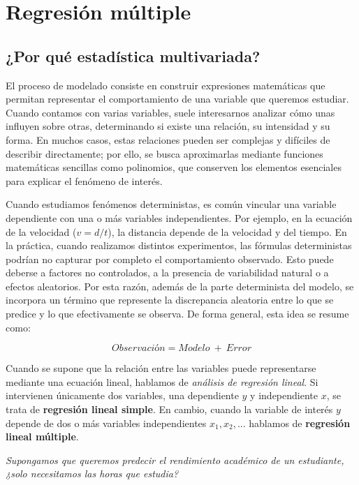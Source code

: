 \documentclass[
]{book}
\begin{document}
\chapter{Regresión múltiple}\label{regresiuxf3n-muxfaltiple}

\section{¿Por qué estadística multivariada?}\label{por-quuxe9-estaduxedstica-multivariada}

El proceso de modelado consiste en construir expresiones matemáticas que permitan representar el comportamiento de una variable que queremos estudiar. Cuando contamos con varias variables, suele interesarnos analizar cómo unas influyen sobre otras, determinando si existe una relación, su intensidad y su forma. En muchos casos, estas relaciones pueden ser complejas y difíciles de describir directamente; por ello, se busca aproximarlas mediante funciones matemáticas sencillas como polinomios, que conserven los elementos esenciales para explicar el fenómeno de interés.

Cuando estudiamos fenómenos deterministas, es común vincular una variable dependiente con una o más variables independientes. Por ejemplo, en la ecuación de la velocidad (\(v=d/t\)), la distancia depende de la velocidad y del tiempo. En la práctica, cuando realizamos distintos experimentos, las fórmulas deterministas podrían no capturar por completo el comportamiento observado. Esto puede deberse a factores no controlados, a la presencia de variabilidad natural o a efectos aleatorios. Por esta razón, además de la parte determinista del modelo, se incorpora un término que represente la discrepancia aleatoria entre lo que se predice y lo que efectivamente se observa. De forma general, esta idea se resume como:

\[Observación = Modelo \ + \ Error\]

Cuando se supone que la relación entre las variables puede representarse mediante una ecuación lineal, hablamos de \emph{análisis de regresión lineal}. Si intervienen únicamente dos variables, una dependiente \(y\) y independiente \(x\), se trata de \textbf{regresión lineal simple}. En cambio, cuando la variable de interés \(y\) depende de dos o más variables independientes \(x_1,x_2, ...\) hablamos de \textbf{regresión lineal múltiple}.

\emph{Supongamos que queremos predecir el rendimiento académico de un estudiante, ¿solo necesitamos las horas que estudia?}
\end{document}
